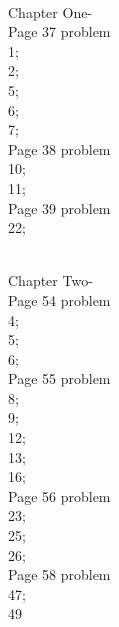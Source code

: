 \documentclass[11pt]{article}
\begin{document}
\\Chapter One-
\\Page 37 problem 
\\1; 
\\2; 
\\5; 
\\6; 
\\7; 
\\Page 38 problem 
\\10; 
\\11;  
\\Page 39 problem 
\\22;

\\Chapter Two-
\\Page 54 problem 
\\4; 
\\5; 
\\6; 
\\Page 55 problem 
\\8; 
\\9; 
\\12; 
\\13; 
\\16;   
\\Page 56 problem 
\\23; 
\\25; 
\\26;
\\Page 58 problem 
\\47; 
\\49
\end{document}
